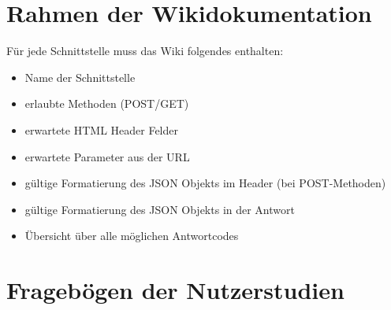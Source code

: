 \section{Rahmen der Wikidokumentation}
Für jede Schnittstelle muss das Wiki folgendes enthalten:
\begin{multicols}{2}
\begin{itemize}
	\item Name der Schnittstelle
	\item erlaubte Methoden (POST/GET)
	\item erwartete HTML Header Felder
	\item erwartete Parameter aus der URL
	\item gültige Formatierung des JSON Objekts im Header (bei POST-Methoden)
	\item gültige Formatierung des JSON Objekts in der Antwort
	\item Übersicht über alle möglichen Antwortcodes 
\end{itemize}
\end{multicols}

\section{Fragebögen der Nutzerstudien}

